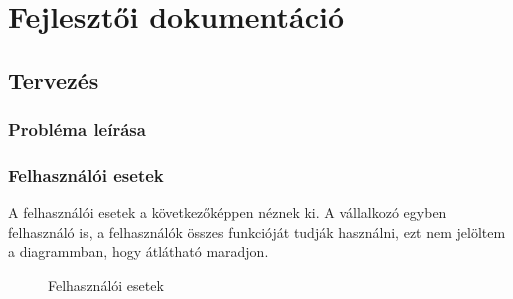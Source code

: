 \chapter{Fejlesztői dokumentáció} %
\label{ch:impl}

\section{Tervezés}

\subsection{Probléma leírása}

\subsection{Felhasználói esetek}
A felhasználói esetek a következőképpen néznek ki. A vállalkozó egyben felhasználó is, a felhasználók összes funkcióját tudják használni, ezt nem jelöltem a diagrammban, hogy átlátható maradjon.

\begin{figure}[H]
	\noindent{}
	\caption{Felhasználói esetek}
	\label{fig:usecases}
\end{figure}

